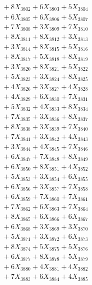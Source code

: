 \documentclass[a4paper,10pt]{article}
\begin{document}
{\begin{align}
&\;  + 8 X_{3802} + 6 X_{3803} + 5 X_{3804} \\[0.3ex]
&\;  + 6 X_{3805} + 6 X_{3806} + 5 X_{3807} \\[0.3ex]
&\;  + 7 X_{3808} + 3 X_{3809} + 7 X_{3810} \\[0.3ex]
&\;  + 8 X_{3811} + 8 X_{3812} + 3 X_{3813} \\[0.3ex]
&\;  + 3 X_{3814} + 8 X_{3815} + 5 X_{3816} \\[0.3ex]
&\;  + 8 X_{3817} + 5 X_{3818} + 8 X_{3819} \\[0.5ex]\allowbreak
&\;  + 3 X_{3820} + 8 X_{3821} + 5 X_{3822} \\[0.3ex]
&\;  + 5 X_{3823} + 3 X_{3824} + 8 X_{3825} \\[0.3ex]
&\;  + 4 X_{3826} + 3 X_{3827} + 4 X_{3828} \\[0.3ex]
&\;  + 4 X_{3829} + 6 X_{3830} + 7 X_{3831} \\[0.3ex]
&\;  + 5 X_{3832} + 4 X_{3833} + 8 X_{3834} \\[0.3ex]
&\;  + 7 X_{3835} + 3 X_{3836} + 8 X_{3837} \\[0.3ex]
&\;  + 8 X_{3838} + 3 X_{3839} + 7 X_{3840} \\[0.3ex]
&\;  + 7 X_{3841} + 3 X_{3842} + 4 X_{3843} \\[0.3ex]
&\;  + 3 X_{3844} + 4 X_{3845} + 7 X_{3846} \\[0.3ex]
&\;  + 6 X_{3847} + 7 X_{3848} + 8 X_{3849} \\[0.5ex]\allowbreak
&\;  + 6 X_{3850} + 8 X_{3851} + 4 X_{3852} \\[0.3ex]
&\;  + 5 X_{3853} + 3 X_{3854} + 6 X_{3855} \\[0.3ex]
&\;  + 6 X_{3856} + 3 X_{3857} + 7 X_{3858} \\[0.3ex]
&\;  + 6 X_{3859} + 7 X_{3860} + 7 X_{3861} \\[0.3ex]
&\;  + 7 X_{3862} + 6 X_{3863} + 7 X_{3864} \\[0.3ex]
&\;  + 8 X_{3865} + 6 X_{3866} + 6 X_{3867} \\[0.3ex]
&\;  + 6 X_{3868} + 3 X_{3869} + 3 X_{3870} \\[0.3ex]
&\;  + 5 X_{3871} + 3 X_{3872} + 6 X_{3873} \\[0.3ex]
&\;  + 8 X_{3874} + 5 X_{3875} + 5 X_{3876} \\[0.3ex]
&\;  + 6 X_{3877} + 8 X_{3878} + 5 X_{3879} \\[0.5ex]\allowbreak
&\;  + 6 X_{3880} + 4 X_{3881} + 4 X_{3882} \\[0.3ex]
&\;  + 7 X_{3883} + 6 X_{3884} + 4 X_{3885} \\[0.3ex]

\end{align}}
\end{document}
